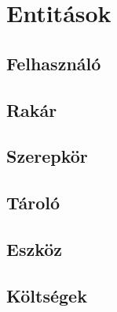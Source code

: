 \chapter{Entitások}

\section{Felhasználó}

\section{Rakár}

\section{Szerepkör}

\section{Tároló}


\section{Eszköz}


\section{Költségek}

